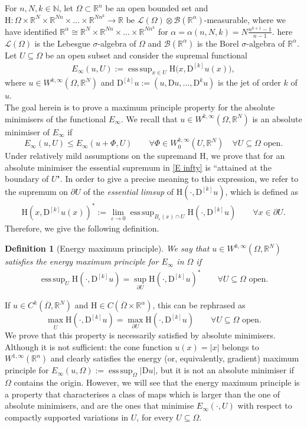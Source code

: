 \documentclass[a4paper,11pt]{article}
\numberwithin{equation}{section}
\newtheorem{Definition}[Theorem]{Definition}
\newcommand{\numberset}{\mathbb}
\newcommand{\eps}{\varepsilon}
\newcommand{\N}{\numberset{N}}
\newcommand{\Om}{\Omega}
\newcommand{\R}{\numberset{R}}
\newcommand{\rom}{\mathrm}
\DeclareMathOperator*{\esssup}{ess\,sup}
\theoremstyle{definition}
\begin{document}
For $n,N,k\in\N$,
 let $\Om\subset\R^n$ be an open bounded set and $\rom{H}:\Om\times\R^N\times\R^{Nn}
\times\ldots\times\R^{Nn^k}\to\R$ be $\mathscr{L}(\Om)\otimes\mathscr{B}(\R^\alpha)$-measurable, where we have identified $\R^\alpha\cong\R^N\times\R^{Nn}\times\ldots\times\R^{Nn^k}$ for $\alpha=\alpha(n,N,k)=N\frac{n^{k+1}-1}{n-1}$. here $\mathscr{L}(\Om)$ is the Lebesgue $\sigma$-algebra of $\Om$ and $\mathscr{B}(\R^\alpha)$ is the Borel $\sigma$-algebra of $\R^\alpha$. Let $U\subseteq\Om$ be an open subset and consider the supremal functional
\begin{align}\label{E infty}
E_{\infty}(u, U):=\esssup_{x\in U}\rom{H}\big(x, \mathrm D ^{[k]}u(x)\big),
\end{align}
where $u\in W^{k,\infty}(\Om,\R^N)$
and $\mathrm D^{[k]} u:=(u,\mathrm Du,\ldots, \mathrm D^ku)$ is the jet of order $k$ of $u$. \\
The goal herein is to prove a maximum principle property for the absolute minimisers of the functional $E_\infty$. We recall that $u\in W^{k,\infty}(\Om,\R^N)$ is an absolute minimiser of $E_\infty$ if 
$$
E_\infty(u,U)\leq E_\infty (u+\Phi,U)\qquad\forall \Phi\in W^{k,\infty}_0(U,\R^N)\quad\forall U\subseteq\Om \mbox{ open}.
$$
Under relatively mild assumptions on the supremand $\rom{H}$, we prove that for an absolute minimiser the essential supremum in \eqref{E infty} is ``attained at the boundary of $U$". In order to give a precise meaning to this expression, we refer to the supremum on $\partial U$ of the \textit{essential limsup} of $\rom{H}(\cdot, \mathrm D ^{[k]}u)$, which is defined as
\begin{align}\label{rep}
\rom{H}(x,\mathrm D ^{[k]}u(x))^*:=\lim_{\eps\to 0}\esssup_{B_\eps(x)\cap U}\rom{H}(\cdot,\mathrm D ^{[k]}u)\qquad\forall x\in \partial U.
\end{align}
Therefore, we give the following definition.
\begin{Definition}[Energy maximum principle]
We say that $u\in W^{k,\infty}(\Om,\R^N)$ satisfies the energy maximum principle for $E_\infty$ in $\Om$ if
\begin{align}\label{MP}
\esssup_U \rom{H}(\cdot, \mathrm D ^{[k]}u)=\sup_{\partial U}\rom{H}(\cdot,\mathrm D ^{[k]}u)^*\qquad\forall U\subseteq\Om \mbox{ open}.
\end{align}
\end{Definition}
\noindent
If $u\in C^k(\overline\Om,\R^N)$ and $\rom{H}\in C(\overline\Om\times\R^\alpha)$, this can be rephrased as
$$
\max_{\overline U} \rom{H}(\cdot, \mathrm D ^{[k]}u)=\max_{\partial U}\rom{H}(\cdot,\mathrm D ^{[k]}u)\qquad\forall U\subseteq\Om \mbox{ open}.
$$
We prove that this property is necessarily satisfied by absolute minimisers. Although it is not sufficient: the cone function $u(x)=|x|$ belongs to $W^{1,\infty}(\R^n)$ and clearly satisfies the energy (or, equivalently, gradient) maximum principle for $E_\infty(u,\Om):=\esssup_\Om|\mathrm Du|$, but it is not an absolute minimiser if $\Om$ contains the origin. However, we will see that the energy maximum principle is a property that characterises a class of maps which is larger than the one of absolute minimisers, and are the ones that minimise $E_\infty(\cdot,U)$ with respect to compactly supported variations in $U$, for every $U\subseteq\Om$.
\end{document}
